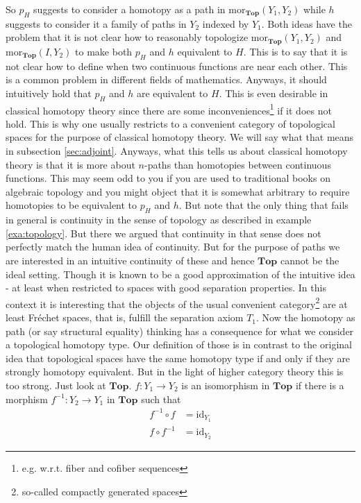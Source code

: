 So $p_{H}$ suggests to consider a homotopy as a path in $\mathrm{mor}_{\mathbf{Top}}(Y_{1},Y_{2})$ while $h$ suggests to consider it a family of paths in $Y_{2}$ indexed by $Y_{1}$. Both ideas have the problem that it is not clear how to reasonably topologize $\mathrm{mor}_{\mathbf{Top}}(Y_{1},Y_{2})$ and $\mathrm{mor}_{\mathbf{Top}}(I,Y_{2})$ to make both $p_{H}$ and $h$ equivalent to $H$. This is to say that it is not clear how to define when two continuous functions are near each other. This is a common problem in different fields of mathematics. Anyways, it should intuitively hold that $p_{H}$ and $h$ are equivalent to $H$. This is even desirable in classical homotopy theory since there are some inconveniences\footnote{e.g. w.r.t. fiber and cofiber sequences} if it does not hold. This is why one usually restricts to a convenient category of topological spaces for the purpose of classical homotopy theory. We will say what that means in subsection \ref{sec:adjoint}. Anyways, what this tells us about classical homotopy theory is that it is more about $n$-paths than homotopies between continuous functions. This may seem odd to you if you are used to traditional books on algebraic topology and you might object that it is somewhat arbitrary to require homotopies to be equivalent to $p_{H}$ and $h$. But note that the only thing that fails in general is continuity in the sense of topology as described in example \ref{exa:topology}. But there we argued that continuity in that sense does not perfectly match the human idea of continuity. But for the purpose of paths we are interested in an intuitive continuity of these and hence $\mathbf{Top}$ cannot be the ideal setting. Though it is known to be a good approximation of the intuitive idea - at least when restricted to spaces with good separation properties. In this context it is interesting that the objects of the usual convenient category\footnote{so-called compactly generated spaces} are at least Fr\'{e}chet spaces, that is, fulfill the separation axiom $T_{1}$. Now the homotopy as path (or say structural equality) thinking has a consequence for what we consider a topological homotopy type. Our definition of those is in contrast to the original idea that topological spaces have the same homotopy type if and only if they are strongly homotopy equivalent. But in the light of higher category theory this is too strong. Just look at $\mathbf{Top}$. $f \colon Y_{1} \rightarrow Y_{2}$ is an isomorphism in $\mathbf{Top}$ if there is a morphism $f^{-1} \colon Y_{2} \rightarrow Y_{1}$ in $\mathbf{Top}$ such that
\begin{align*}
  f^{-1}
  \circ
  f
  &=
  \mathrm{id}_{Y_{1}}
  \\
  f
  \circ
  f^{-1}
  &=
  \mathrm{id}_{Y_{2}}
\end{align*}
